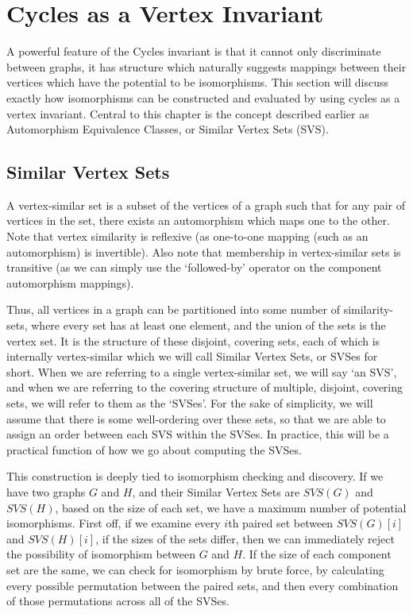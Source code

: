 \chapter{Cycles as a Vertex Invariant}

A powerful feature of the Cycles invariant is that it cannot only discriminate between graphs, it has structure which naturally suggests mappings between their vertices which have the potential to be isomorphisms.
This section will discuss exactly how isomorphisms can be constructed and evaluated by using cycles as a vertex invariant.
Central to this chapter is the concept described earlier as Automorphism Equivalence Classes, or Similar Vertex Sets (SVS).

\section{Similar Vertex Sets}

A vertex-similar set is a subset of the vertices of a graph such that for any pair of vertices in the set, there exists an automorphism which maps one to the other.
Note that vertex similarity is reflexive (as one-to-one mapping (such as an automorphism) is invertible). 
Also note that membership in vertex-similar sets is transitive (as we can simply use the `followed-by' operator on the component automorphism mappings).

Thus, all vertices in a graph can be partitioned into some number of similarity-sets, where every set has at least one element, and the union of the sets is the vertex set.
It is the structure of these disjoint, covering sets, each of which is internally vertex-similar which we will call Similar Vertex Sets, or SVSes for short.
When we are referring to a single vertex-similar set, we will say `an SVS', and when we are referring to the covering structure of multiple, disjoint, covering sets, we will refer to them as the `SVSes'.
For the sake of simplicity, we will assume that there is some well-ordering over these sets, so that we are able to assign an order between each SVS within the SVSes.
In practice, this will be a practical function of how we go about computing the SVSes.

This construction is deeply tied to isomorphism checking and discovery.
If we have two graphs $G$ and $H$, and their Similar Vertex Sets are $SVS(G)$ and $SVS(H)$, based on the size of each set, we have a maximum number of potential isomorphisms.
First off, if we examine every $i$th paired set between $SVS(G)[i]$ and  $SVS(H)[i]$, if the sizes of the sets differ, then we can immediately reject the possibility of isomorphism between $G$ and $H$.
If the size of each component set are the same, we can check for isomorphism by brute force, by calculating every possible permutation between the paired sets, and then every combination of those permutations across all of the SVSes.

